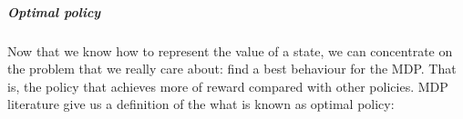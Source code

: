 %
%
%
%



\subparagraph{Optimal policy}

Now that we know how to represent the value of
a state, we can concentrate on the problem that we really care about:
find a best behaviour for the MDP. That is, the policy that achieves more of reward
compared with other policies.
MDP literature give us a definition of the what is
known as optimal policy:

 \cite{Sutton2012}

